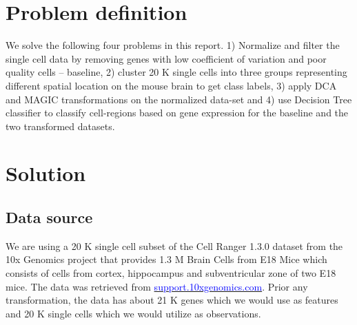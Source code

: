 \section*{Problem definition}
We solve the following four problems in this report. 1) Normalize and filter the single cell data by removing genes with low coefficient of variation and poor quality cells -- baseline, 2) cluster 20 K single cells into three groups representing different spatial location on the mouse brain to get class labels, 3) apply DCA and MAGIC transformations on the normalized data-set and 4) use Decision Tree classifier to classify cell-regions based on gene expression for the baseline and the two transformed datasets.

\section*{Solution}

\subsection*{Data source}
We are using a 20 K single cell subset of the Cell Ranger 1.3.0 dataset from the 10x Genomics project that provides 1.3 M Brain Cells from E18 Mice which consists of cells from cortex, hippocampus and subventricular zone of two E18 mice. The data was retrieved from \href{https://support.10xgenomics.com/single-cell-gene-expression/datasets/1.3.0/1M_neurons}{\textcolor{blue}{support.10xgenomics.com}}. Prior any transformation, the data has about 21 K genes which we would use as features and 20 K single cells which we would utilize as observations.

